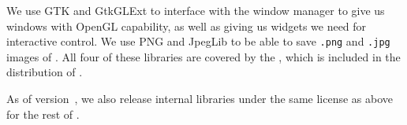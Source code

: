 We use GTK and GtkGLExt to interface with the window manager to give us
windows with OpenGL capability, as well as giving us widgets we need for
interactive control.  We use PNG and JpegLib to be able to save
\texttt{.png} and \texttt{.jpg} images of \map{}.
All four of these libraries are covered by the , which is included in the
distribution of \map{}.

As of version~\version{}, we also release internal libraries under the
same license as above for the rest of \map{}.  



